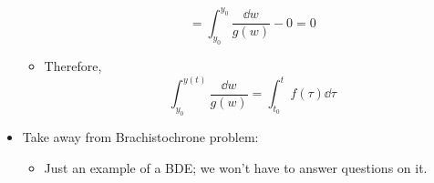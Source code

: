 \documentclass[../notes.tex]{subfiles}
\begin{document}
\begin{itemize}
\begin{itemize}
\begin{equation*}
            = \int_{y_0}^{y_0}\frac{\dd{w}}{g(w)}-0
            = 0
        \end{equation*}
        \item Therefore,
        \begin{equation*}
            \int_{y_0}^{y(t)}\frac{\dd{w}}{g(w)} = \int_{t_0}^tf(\tau)\dd{\tau}
        \end{equation*}
    \end{itemize}
    \item Take away from Brachistochrone problem:
    \begin{itemize}
        \item Just an example of a BDE; we won't have to answer questions on it.
    \end{itemize}
\end{itemize}
\end{document}
